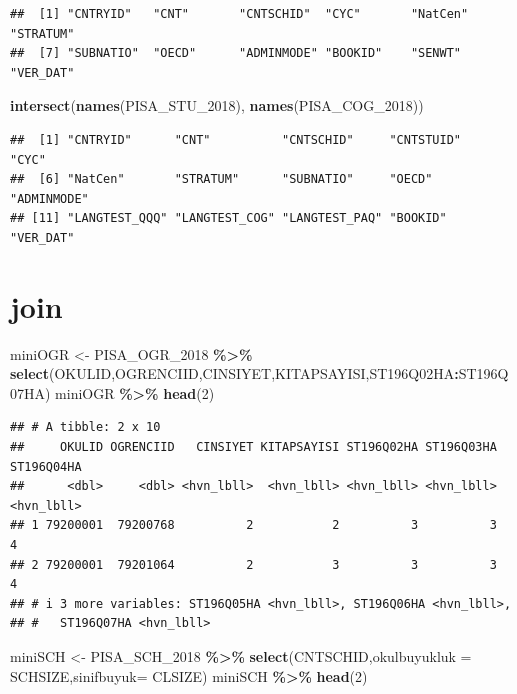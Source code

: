 \documentclass[
  oneside]{book}
\newenvironment{Shaded}{\begin{snugshade}}{\end{snugshade}}
\newcommand{\AttributeTok}[1]{\textcolor[rgb]{0.13,0.29,0.53}{#1}}
\newcommand{\DecValTok}[1]{\textcolor[rgb]{0.00,0.00,0.81}{#1}}
\newcommand{\FunctionTok}[1]{\textcolor[rgb]{0.13,0.29,0.53}{\textbf{#1}}}
\newcommand{\NormalTok}[1]{#1}
\newcommand{\OtherTok}[1]{\textcolor[rgb]{0.56,0.35,0.01}{#1}}
\newcommand{\SpecialCharTok}[1]{\textcolor[rgb]{0.81,0.36,0.00}{\textbf{#1}}}
\begin{document}
\begin{verbatim}
##  [1] "CNTRYID"   "CNT"       "CNTSCHID"  "CYC"       "NatCen"    "STRATUM"  
##  [7] "SUBNATIO"  "OECD"      "ADMINMODE" "BOOKID"    "SENWT"     "VER_DAT"
\end{verbatim}

\begin{Shaded}
\begin{Highlighting}[]
\FunctionTok{intersect}\NormalTok{(}\FunctionTok{names}\NormalTok{(PISA\_STU\_2018), }\FunctionTok{names}\NormalTok{(PISA\_COG\_2018))}
\end{Highlighting}
\end{Shaded}

\begin{verbatim}
##  [1] "CNTRYID"      "CNT"          "CNTSCHID"     "CNTSTUID"     "CYC"         
##  [6] "NatCen"       "STRATUM"      "SUBNATIO"     "OECD"         "ADMINMODE"   
## [11] "LANGTEST_QQQ" "LANGTEST_COG" "LANGTEST_PAQ" "BOOKID"       "VER_DAT"
\end{verbatim}

\hypertarget{join}{%
\section{join}\label{join}}

\begin{Shaded}
\begin{Highlighting}[]
\NormalTok{miniOGR }\OtherTok{\textless{}{-}}\NormalTok{ PISA\_OGR\_2018 }\SpecialCharTok{\%\textgreater{}\%} \FunctionTok{select}\NormalTok{(OKULID,OGRENCIID,CINSIYET,KITAPSAYISI,ST196Q02HA}\SpecialCharTok{:}\NormalTok{ST196Q07HA)}
\NormalTok{miniOGR }\SpecialCharTok{\%\textgreater{}\%} \FunctionTok{head}\NormalTok{(}\DecValTok{2}\NormalTok{)}
\end{Highlighting}
\end{Shaded}

\begin{verbatim}
## # A tibble: 2 x 10
##     OKULID OGRENCIID   CINSIYET KITAPSAYISI ST196Q02HA ST196Q03HA ST196Q04HA
##      <dbl>     <dbl> <hvn_lbll>  <hvn_lbll> <hvn_lbll> <hvn_lbll> <hvn_lbll>
## 1 79200001  79200768          2           2          3          3          4
## 2 79200001  79201064          2           3          3          3          4
## # i 3 more variables: ST196Q05HA <hvn_lbll>, ST196Q06HA <hvn_lbll>,
## #   ST196Q07HA <hvn_lbll>
\end{verbatim}

\begin{Shaded}
\begin{Highlighting}[]
\NormalTok{miniSCH }\OtherTok{\textless{}{-}}\NormalTok{ PISA\_SCH\_2018 }\SpecialCharTok{\%\textgreater{}\%} \FunctionTok{select}\NormalTok{(CNTSCHID,}\AttributeTok{okulbuyukluk =}\NormalTok{ SCHSIZE,}\AttributeTok{sinifbuyuk=}\NormalTok{ CLSIZE)}
\NormalTok{miniSCH }\SpecialCharTok{\%\textgreater{}\%} \FunctionTok{head}\NormalTok{(}\DecValTok{2}\NormalTok{)}
\end{Highlighting}
\end{Shaded}
\end{document}
